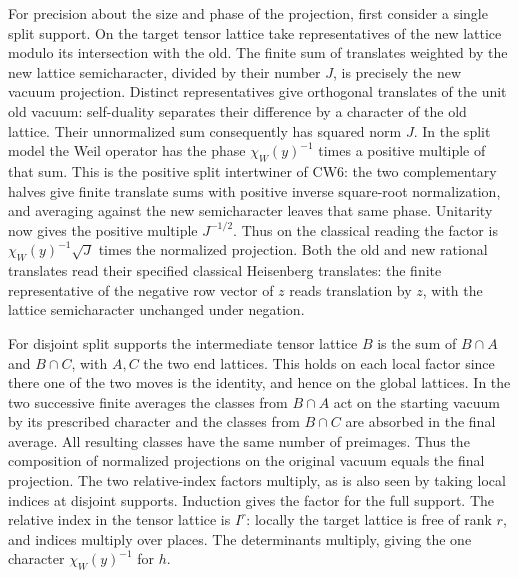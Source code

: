 For precision about the size and phase of the projection, first
consider a single split support. On the target tensor lattice take
representatives of the new lattice modulo its intersection with the
old. The finite sum of translates weighted by the new lattice
semicharacter, divided by their number $J$, is precisely the
new vacuum projection. Distinct representatives give orthogonal
translates of the unit old vacuum: self-duality separates their
difference by a character of the old lattice. Their unnormalized
sum consequently has squared norm $J$. In the split model the
Weil operator has the phase $\chi_W(y)^{-1}$ times a positive
multiple of that sum. This is the positive split intertwiner of
CW6: the two complementary halves give finite translate sums with
positive inverse square-root normalization, and averaging against
the new semicharacter leaves that same phase. Unitarity now gives
the positive multiple $J^{-1/2}$. Thus on the classical reading the
factor is $\chi_W(y)^{-1}\sqrt J$ times the normalized projection.
Both the old and new rational translates read their specified
classical Heisenberg translates: the finite representative of
the negative row vector of $z$ reads translation by $z$, with
the lattice semicharacter unchanged under negation.

For disjoint split supports the intermediate tensor lattice $B$
is the sum of $B\cap A$ and $B\cap C$, with $A,C$ the two
end lattices. This holds on each local factor since there one of
the two moves is the identity, and hence on the global lattices.
In the two successive finite averages the classes from $B\cap A$
act on the starting vacuum by its prescribed character and the
classes from $B\cap C$ are absorbed in the final average. All
resulting classes have the same number of preimages. Thus the
composition of normalized projections on the original vacuum
equals the final projection. The two relative-index factors
multiply, as is also seen by taking local indices at disjoint
supports. Induction gives the factor for the full support.
The relative index in the tensor lattice is $I^r$: locally the
target lattice is free of rank $r$, and indices multiply over
places. The determinants multiply, giving the one character
$\chi_W(y)^{-1}$ for $h$.

